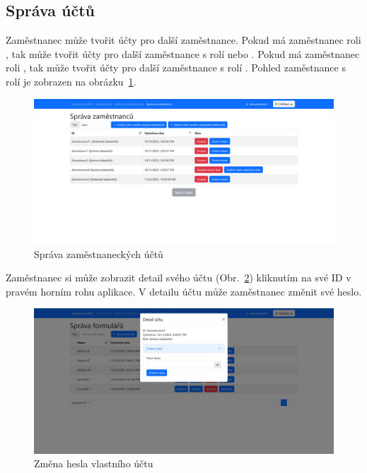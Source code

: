 \subsection{Správa účtů}\label{subsec:sprava-uctu}

Zaměstnanec může tvořit účty pro další zaměstnance.
Pokud má zaměstnanec roli , tak může tvořit účty pro další zaměstnance s rolí  nebo .
Pokud má zaměstnanec roli , tak může tvořit účty pro další zaměstnance s rolí .
Pohled zaměstnance s rolí  je zobrazen na obrázku~\ref{fig:sprava-zamestnancu-screenshot}.

\begin{figure}[H]
    \centering
    \includegraphics[width=\textwidth]{../img/screenshots/sprava-zamestnancu}
    \caption{Správa zaměstnaneckých účtů}\label{fig:sprava-zamestnancu-screenshot}
\end{figure}

Zaměstnanec si může zobrazit detail svého účtu (Obr.~\ref{fig:zmena-hesla-zamestnanec}) kliknutím na své ID v pravém horním rohu aplikace.
V detailu účtu může zaměstnanec změnit své heslo.

\begin{figure}[H]
    \centering
    \includegraphics[width=\textwidth]{../img/screenshots/zmena-hesla-zamestnanec}
    \caption{Změna hesla vlastního účtu}\label{fig:zmena-hesla-zamestnanec}
\end{figure}


